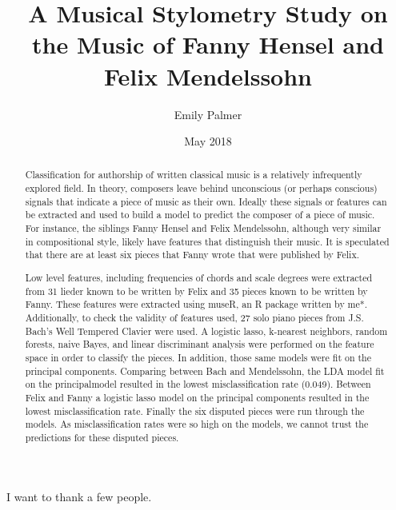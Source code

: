 \documentclass[12pt,twoside]{reedthesis}
\title{A Musical Stylometry Study on the Music of Fanny Hensel and Felix
Mendelssohn}
\author{Emily Palmer}
\date{May 2018}
\theoremstyle{definition}
\theoremstyle{definition}
\theoremstyle{definition}
\theoremstyle{remark}
\begin{document}
  \maketitle

\frontmatter %
\pagestyle{empty} %
  \begin{acknowledgements}
    I want to thank a few people.
  \end{acknowledgements}

  \hypersetup{linkcolor=black}
  \setcounter{tocdepth}{2}
  \tableofcontents

  \listoftables

  \listoffigures
  \begin{abstract}
    Classification for authorship of written classical music is a relatively
    infrequently explored field. In theory, composers leave behind
    unconscious (or perhaps conscious) signals that indicate a piece of
    music as their own. Ideally these signals or features can be extracted
    and used to build a model to predict the composer of a piece of music.
    For instance, the siblings Fanny Hensel and Felix Mendelssohn, although
    very similar in compositional style, likely have features that
    distinguish their music. It is speculated that there are at least six
    pieces that Fanny wrote that were published by Felix.
    
    Low level features, including frequencies of chords and scale degrees
    were extracted from 31 lieder known to be written by Felix and 35 pieces
    known to be written by Fanny. These features were extracted using museR,
    an R package written by me*. Additionally, to check the validity of
    features used, 27 solo piano pieces from J.S. Bach's Well Tempered
    Clavier were used. A logistic lasso, k-nearest neighbors, random
    forests, naive Bayes, and linear discriminant analysis were performed on
    the feature space in order to classify the pieces. In addition, those
    same models were fit on the principal components. Comparing between Bach
    and Mendelssohn, the LDA model fit on the principalmodel resulted in the
    lowest misclassification rate (0.049). Between Felix and Fanny a
    logistic lasso model on the principal components resulted in the lowest
    misclassification rate. Finally the six disputed pieces were run through
    the models. As misclassification rates were so high on the models, we
    cannot trust the predictions for these disputed pieces.
  \end{abstract}
\end{document}
